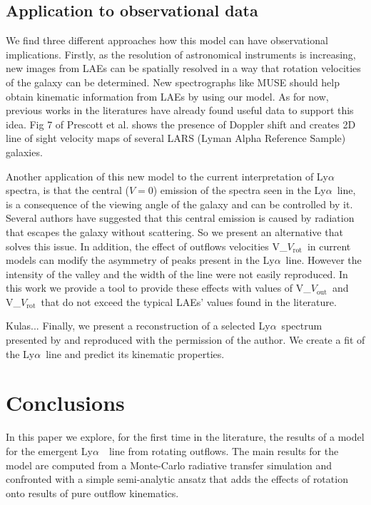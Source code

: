\documentclass[a4paper,fleqn,usenatbib]{mnras}
\newcommand{\lya}{\ifmmode{{\rm Ly}\alpha}\else Ly$\alpha$\ \fi}
\newcommand{\vrot}{\ifmmode\mathrm V_{\mathrm{rot}}\else $V_{\mathrm{rot}}$~\fi}
\newcommand{\vout}{\ifmmode\mathrm V_{\mathrm{out}}\else $V_{\mathrm{out}}$~\fi}
\begin{document}
\subsection{Application to observational data}

We find three different approaches how this model can have observational
implications. Firstly, as the resolution of astronomical instruments is
increasing, new images from LAEs can be spatially resolved in a way that
rotation velocities of the galaxy can be determined. New spectrographs like
MUSE should help obtain kinematic information from LAEs by using our model.
As for now, previous works in the literatures have already found useful data
to support this idea. Fig 7 of Prescott et al. \cite{Prescott14} shows the
presence of Doppler shift and \cite{Herenz2016} creates 2D line of sight
velocity maps of several LARS (Lyman Alpha Reference Sample) galaxies.

Another application of this new model to the current interpretation of \lya
spectra, is that the central ($V=0$) emission of the spectra seen in the
\lya line, is a consequence of the viewing angle of the galaxy and can be
controlled by it. Several authors have suggested that this central emission
is caused by radiation that escapes the galaxy without scattering. So we
present an alternative that solves this issue. In addition, the effect of
outflows velocities \vrot in current models can modify the asymmetry of peaks
present in the \lya line. However the intensity of the valley and the width
of the line were not easily reproduced. In this work we provide a tool to
provide these effects with values of \vout and \vrot that do not exceed the
typical LAEs' values found in the literature.

\color{red}
Kulas...
\color{black}
Finally, we present a reconstruction of a selected \lya spectrum presented
by \cite{Kulas12} and reproduced with the permission of the author. We create
a fit of the \lya line and predict its kinematic properties.

\section{Conclusions}
\label{sec:conclusions}

In this paper we explore, for the first time in the literature,
the results of a model for the emergent \lya\ line from rotating outflows.
The main results for the model are computed from a Monte-Carlo radiative transfer
simulation and confronted with a simple semi-analytic ansatz that adds the effects
of rotation onto results of pure outflow kinematics.
\end{document}
